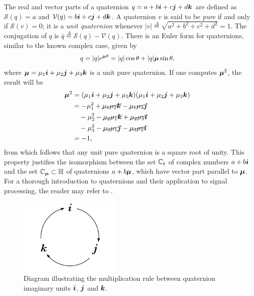 The real and vector parts of a quaternion $ q = a + b \boldsymbol{i} + c \boldsymbol{j} + d \boldsymbol{k} $ are defined as $ \mathcal{S}(q) = a $ and $ \mathcal{V}(q) = b \boldsymbol{i} + c \boldsymbol{j} + d \boldsymbol{k} $. A quaternion $ v $ is said to be \textit{pure} if and only if $ \mathcal{S}(v) = 0 $; it is a \textit{unit quaternion} whenever $ |v| \overset{\Delta}{=} \sqrt{a^2 + b^2 + c^2 + d^2} = 1 $. The conjugation of $ q $ is $ \bar{q} \overset{\Delta}{=} \mathcal{S}(q) - \mathcal{V}(q) $. There is an Euler form for quaternions, similar to the known complex case, given by
\begin{equation}
\label{eq:euler}
q = |q| e^{\boldsymbol{\mu} \theta} = |q|\cos \theta + |q|\boldsymbol{\mu} \sin \theta,
\end{equation}
where $ \boldsymbol{\mu} = \mu_1 \boldsymbol{i} + \mu_2 \boldsymbol{j} + \mu_3 \boldsymbol{k}$ is a unit pure quaternion. If one computes $ \boldsymbol{\mu}^2 $, the result will be
\begin{equation}
\begin{aligned}
\boldsymbol{\mu}^2 & = (\mu_1 \boldsymbol{i} + \mu_2 \boldsymbol{j} + \mu_3 \boldsymbol{k}) (\mu_1 \boldsymbol{i} + \mu_2 \boldsymbol{j} + \mu_3 \boldsymbol{k}) \\
& = -\mu_1^2 + \cancel{\mu_1\mu_2 \boldsymbol{k}} - \cancel{\mu_1\mu_3 \boldsymbol{j}} \\
& \quad - \mu_2^2 - \cancel{\mu_2\mu_1 \boldsymbol{k}} + \cancel{\mu_2\mu_3 \boldsymbol{i}} \\
& \quad -\mu_3^2 - \cancel{\mu_3\mu_1 \boldsymbol{j}} - \cancel{\mu_3\mu_2 \boldsymbol{i}} \\
&= -1,
\end{aligned}
\end{equation}
from which follows that any unit pure quaternion is a square root of unity. This property justifies the isomorphism between the set $ \mathbb{C}_{\boldsymbol{i}} $ of complex numbers $ a + b\boldsymbol{i} $ and the set $ \mathbb{C}_{\boldsymbol{\mu}} \subset \mathbb{H}$ of quaternions $ a + b\boldsymbol{\mu} $, which have vector part parallel to $ \boldsymbol{\mu} $. For a thorough introduction to quaternions and their application to signal processing, the reader may refer to \cite{zhang1997quaternions,ell2014quaternion,flamant2017time}.

\begin{figure}
\centering
\includegraphics[width=5cm]{Figures/quaternion_multiplication.pdf}
\caption{Diagram illustrating the multiplication rule between quaternion imaginary units $ \boldsymbol{i} $, $ \boldsymbol{j} $ and $ \boldsymbol{k} $.}
\label{fig:quatmult}
\end{figure}


